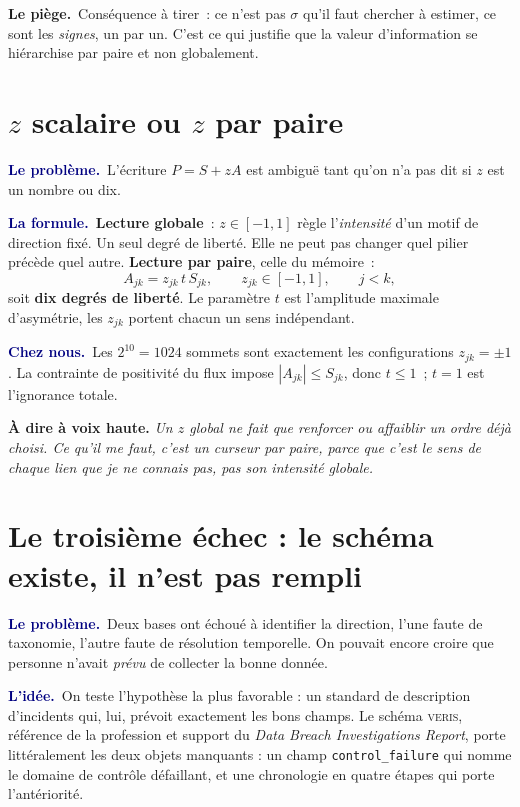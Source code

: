 \documentclass[11pt,a4paper]{article}
\newcommand{\lequoi}[1]{\smallskip\noindent\textcolor{navy}{\textbf{Le problème.}}\ #1\par}
\newcommand{\lidee}[1]{\smallskip\noindent\textcolor{navy}{\textbf{L'idée.}}\ #1\par}
\newcommand{\laformule}[1]{\smallskip\noindent\textcolor{navy}{\textbf{La formule.}}\ #1\par}
\newcommand{\cheznous}[1]{\smallskip\noindent\textcolor{navy}{\textbf{Chez nous.}}\ #1\par}
\newcommand{\lepiege}[1]{\smallskip\noindent\textcolor{accent}{\textbf{Le piège.}}\ #1\par}
\newcommand{\laphrase}[1]{\begin{phrasebox}\textbf{À dire à voix haute.} \emph{#1}\end{phrasebox}}
\begin{document}
\lepiege{Conséquence à tirer~: ce n'est pas $\sigma$ qu'il faut chercher à estimer, ce sont
les \emph{signes}, un par un. C'est ce qui justifie que la valeur d'information se
hiérarchise par paire et non globalement.}

\section{$z$ scalaire ou $z$ par paire}

\lequoi{L'écriture $P=S+zA$ est ambiguë tant qu'on n'a pas dit si $z$ est un nombre ou dix.}

\laformule{\textbf{Lecture globale}~: $z\in[-1,1]$ règle l'\emph{intensité} d'un motif de
direction fixé. Un seul degré de liberté. Elle ne peut pas changer quel pilier précède
quel autre.
\textbf{Lecture par paire}, celle du mémoire~:
\[
  A_{jk}=z_{jk}\,t\,S_{jk}, \qquad z_{jk}\in[-1,1], \qquad j<k,
\]
soit \textbf{dix degrés de liberté}. Le paramètre $t$ est l'amplitude maximale d'asymétrie,
les $z_{jk}$ portent chacun un sens indépendant.}

\cheznous{Les $2^{10}=1024$ sommets sont exactement les configurations $z_{jk}=\pm1$. La
contrainte de positivité du flux impose $|A_{jk}|\le S_{jk}$, donc $t\le1$~; $t=1$ est
l'ignorance totale.}

\laphrase{Un $z$ global ne fait que renforcer ou affaiblir un ordre déjà choisi. Ce qu'il me
faut, c'est un curseur par paire, parce que c'est le \emph{sens} de chaque lien que je ne
connais pas, pas son intensité globale.}

\section{Le troisième échec : le schéma existe, il n'est pas rempli}

\lequoi{Deux bases ont échoué à identifier la direction, l'une faute de taxonomie, l'autre
faute de résolution temporelle. On pouvait encore croire que personne n'avait \emph{prévu} de
collecter la bonne donnée.}

\lidee{On teste l'hypothèse la plus favorable : un standard de description d'incidents qui,
lui, prévoit exactement les bons champs. Le schéma \textsc{veris}, référence de la profession
et support du \emph{Data Breach Investigations Report}, porte littéralement les deux objets
manquants : un champ \texttt{control\_failure} qui nomme le domaine de contrôle défaillant, et
une chronologie en quatre étapes qui porte l'antériorité.}
\end{document}
